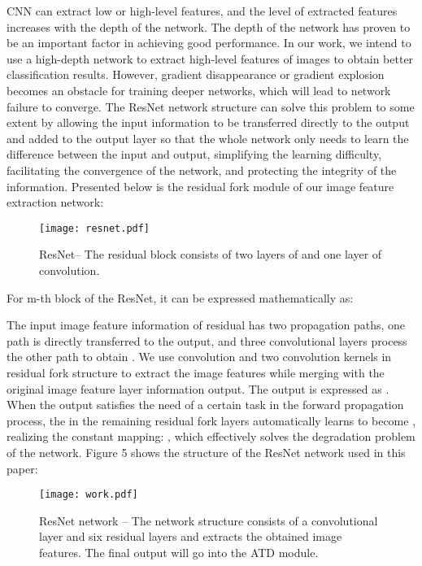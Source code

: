 \documentclass{ecai}
\begin{document}
CNN can extract low or high-level features, and the level of extracted features increases with the depth of the network. The depth of the network has proven to be an important factor in achieving good performance. In our work, we intend to use a high-depth network to extract high-level features of images to obtain better classification results. However, gradient disappearance or gradient explosion becomes an obstacle for training deeper networks, which will lead to network failure to converge. The ResNet network structure can solve this problem to some extent by allowing the input information to be transferred directly to the output and added to the output layer so that the whole network only needs to learn the difference between the input and output, simplifying the learning difficulty, facilitating the convergence of the network, and protecting the integrity of the information. Presented below is the residual fork module of our image feature extraction network:

\begin{figure}
\centerline{\texttt{[image: resnet.pdf]}}
\caption{ResNet-- The residual block consists of two layers of   and one layer of  convolution. }
\end{figure}


For m-th block of the ResNet, it can be expressed mathematically as:

The input image feature information  of residual has two propagation paths, one path is directly transferred to the output, and three convolutional layers process the other path to obtain . We use  convolution and two   convolution kernels in residual fork structure to extract the image features while merging with the original image feature layer information output. The output  is expressed as . When the output  satisfies the need of a certain task in the forward propagation process, the  in the remaining residual fork layers automatically learns to become , realizing the constant mapping: , which effectively solves the degradation problem of the network. Figure 5 shows the structure of the ResNet network used in this paper:
\begin{figure}[htp]
\centering
\texttt{[image: work.pdf]}
\caption{ResNet network -- The network structure consists of a convolutional layer and six residual layers and extracts the obtained image features. The final output will go into the ATD module.}
\end{figure}
\end{document}
